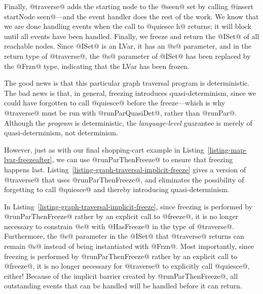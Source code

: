 Finally, @traverse@ adds the starting node to the @seen@ set by
calling @insert startNode seen@---and the event handler does the rest
of the work.  We know that we are done handling events when the call
to @quiesce h@ returns; it will block until all events have been
handled.  Finally, we freeze and return the @ISet@ of all reachable
nodes.  Since @ISet@ is an LVar, it has an @s@ parameter, and in the
return type of @traverse@, the @s@ parameter of @ISet@ has been
replaced by the @Frzn@ type, indicating that the LVar has been frozen.

The good news is that this particular graph traversal program is
deterministic.  The bad news is that, in general, freezing introduces
quasi-determinism, since we could have forgotten to call @quiesce@
before the freeze---which is why @traverse@ must be run with
@runParQuasiDet@, rather than @runPar@.  Although the \emph{program}
is deterministic, the \emph{language-level} guarantee is merely of
quasi-determinism, not determinism.

However, just as with our final shopping-cart example in
Listing~\ref{listing-map-lvar-freezeafter}, we can use
@runParThenFreeze@ to ensure that freezing happens last.
Listing~\ref{listing-graph-traversal-implicit-freeze} gives a version
of @traverse@ that uses @runParThenFreeze@, and eliminates the
possibility of forgetting to call @quiesce@ and thereby introducing
quasi-determinism.

\singlespacing

\doublespacing

In Listing~\ref{listing-graph-traversal-implicit-freeze}, since
freezing is performed by @runParThenFreeze@ rather by an explicit call
to @freeze@, it is no longer necessary to constrain @e@ with
@HasFreeze@ in the type of @traverse@.  Furthermore, the @s@ parameter
in the @ISet@ that @traverse@ returns can remain @s@ instead of being
instantiated with @Frzn@.  Most importantly, since freezing is
performed by @runParThenFreeze@ rather by an explicit call to
@freeze@, it is no longer necessary for @traverse@ to explicitly call
@quiesce@, either!  Because of the implicit barrier created by
@runParThenFreeze@, all outstanding events that can be handled will be
handled before it can return.
